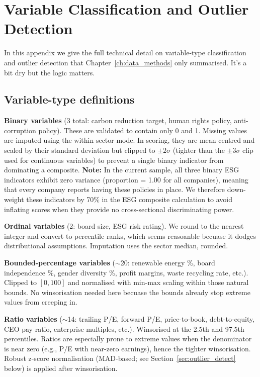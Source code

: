 \chapter{Variable Classification and Outlier Detection}
\label{app:varclass}

In this appendix we give the full technical detail on variable-type classification and outlier detection that Chapter~\ref{ch:data_methods} only summarised. It's a bit dry but the logic matters.

\section{Variable-type definitions}

\textbf{Binary variables} (3 total: carbon reduction target, human rights policy, anti-corruption policy). These are validated to contain only 0 and 1. Missing values are imputed using the within-sector mode. In scoring, they are mean-centred and scaled by their standard deviation but clipped to $\pm 2\sigma$ (tighter than the $\pm 3\sigma$ clip used for continuous variables) to prevent a single binary indicator from dominating a composite. \textbf{Note:} In the current sample, all three binary ESG indicators exhibit zero variance (proportion = 1.00 for all companies), meaning that every company reports having these policies in place. We therefore down-weight these indicators by 70\% in the ESG composite calculation to avoid inflating scores when they provide no cross-sectional discriminating power.

\textbf{Ordinal variables} (2: board size, ESG risk rating). We round to the nearest integer and convert to percentile ranks, which seems reasoanble becuase it dodges distributional assumptions. Imputation uses the sector median, rounded.

\textbf{Bounded-percentage variables} ($\sim$20: renewable energy \%, board independence \%, gender diversity \%, profit margins, waste recycling rate, etc.). Clipped to $[0, 100]$ and normalised with min-max scaling within those natural bounds. No winsorisation needed here becuase the bounds already stop extreme values from creeping in.

\textbf{Ratio variables} ($\sim$14: trailing P/E, forward P/E, price-to-book, debt-to-equity, CEO pay ratio, enterprise multiples, etc.). Winsorised at the 2.5th and 97.5th percentiles. Ratios are especially prone to extreme values when the denominator is near zero (e.g., P/E with near-zero earnings), hence the tighter winsorisation. Robust z-score normalisation (MAD-based; see Section~\ref{sec:outlier_detect} below) is applied after winsorisation.

